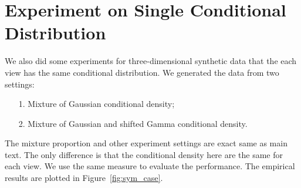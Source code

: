\section{Experiment on Single Conditional Distribution}

We also did some experiments for three-dimensional synthetic data that the each view has the same conditional distribution. We generated the data from two settings:
\begin{itemize}
\item[1.] Mixture of Gaussian conditional density;
\item[2.] Mixture of Gaussian and shifted Gamma conditional density.
\end{itemize}
The mixture proportion and other experiment settings are exact same as main text. The only difference is that the conditional density here are the same for each view. We use the same measure to evaluate the performance. The empirical results are plotted in Figure~\ref{fig:sym_case}.

